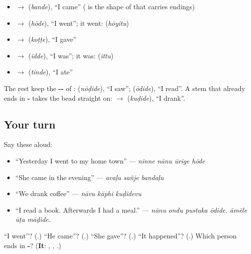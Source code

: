 \begin{itemize}
\raggedright
  \item \textbf{} $\to$ \textbf{} (\emph{bande}), \textquotedblleft{}I came\textquotedblright{} (\textbf{} is the shape of \textbf{} that carries endings)
  \item \textbf{} $\to$ \textbf{} (\emph{hōde}), \textquotedblleft{}I went\textquotedblright{}; it went: \textbf{} (\emph{hōyitu})
  \item \textbf{} $\to$ \textbf{} (\emph{koṭṭe}), \textquotedblleft{}I gave\textquotedblright{}
  \item \textbf{} $\to$ \textbf{} (\emph{idde}), \textquotedblleft{}I was\textquotedblright{}; it was: \textbf{} (\emph{ittu})
  \item \textbf{} $\to$ \textbf{} (\emph{tinde}), \textquotedblleft{}I ate\textquotedblright{}
\end{itemize}

The rest keep the \textbf{--} of \textbf{}: \textbf{} (\emph{nōḍide}), \textquotedblleft{}I saw\textquotedblright{}; \textbf{} (\emph{ōdide}), \textquotedblleft{}I read\textquotedblright{}. A stem that already ends in \textbf{-} takes the bead straight on: \textbf{} $\to$ \textbf{} (\emph{kuḍide}), \textquotedblleft{}I drank\textquotedblright{}.

\subsection*{Your turn}
Say these aloud:

\begin{itemize}
\raggedright
  \item \textquotedblleft{}Yesterday I went to my home town\textquotedblright{} — \emph{ninne nānu ūrige hōde}
  \item \textquotedblleft{}She came in the evening\textquotedblright{} — \emph{avaḷu sañje bandaḷu}
  \item \textquotedblleft{}We drank coffee\textquotedblright{} — \emph{nāvu kāphi kuḍidevu}
  \item \textquotedblleft{}I read a book. Afterwards I had a meal.\textquotedblright{} — \emph{nānu ondu pustaka ōdide. āmēle ūṭa māḍide.}
\end{itemize}

\begin{tcolorbox}[breakable,colback=teal!4,colframe=teal!35!black,title={Before you move on}]
\textquotedblleft{}I went\textquotedblright{}? (\textbf{}.) \textquotedblleft{}He came\textquotedblright{}? (\textbf{}.) \textquotedblleft{}She gave\textquotedblright{}? (\textbf{}.) \textquotedblleft{}It happened\textquotedblright{}? (\textbf{}.) Which person ends in \textbf{-}? (\textbf{It}: \textbf{}, \textbf{}, \textbf{}.)
\end{tcolorbox}
